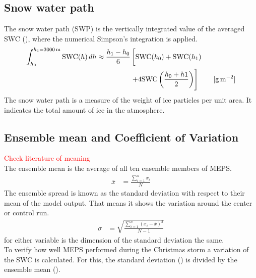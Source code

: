 \subsection{Snow water path}
The snow water path (SWP) is the vertically integrated value of the averaged SWC (), where the numerical Simpson's integration is applied.  
\begin{equation}
\begin{split}
\int_{h_0}^{h_1=\SI{3000}{\metre}} \text{SWC}(h) \, dh \approx 
\frac{h_1 - h_0}{6}  & \left[ \text{SWC}(h_0)    + \text{SWC}(h_1)   \vphantom{\frac{h_0 + h1}{2}} \right. \\ 
& \left. + 4 \text{SWC}\left(\frac{h_0 + h1}{2}\right)  
\right] \qquad [\SI{}{\g\per\square\meter}]
\end{split}
\label{eq:SWP}
\end{equation}
The snow water path is a measure of the weight of ice particles per unit area. It indicates the total amount of ice in the atmosphere.
\subsection{Ensemble mean and Coefficient of Variation}\label{sec:ens_mean_spread}
\textcolor{red}{Check literature of meaning} \\
The ensemble mean is the average of all ten ensemble members of MEPS.
\begin{align}
	\bar{x} & = \frac{\sum_{i=1}^n x_i}{N} \label{eq:meanMEPS}
\end{align}
The ensemble spread is known as the standard deviation with respect to their mean of the model output. That means it shows the variation around the center or control run.
\begin{align}
	\sigma & = \sqrt{\frac{\sum_{i=1}^n (x_i - \bar{x})^2}{N-1}} \label{eq:stdMEPS}
\end{align}
for either variable is the dimension of the standard deviation the same.
\\
To verify how well MEPS performed during the Christmas storm a variation of the SWC is calculated. For this, the standard deviation () is divided by the ensemble mean ().


